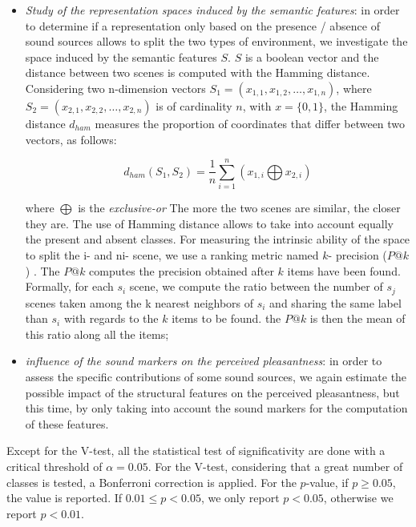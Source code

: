\documentclass[twoside,twocolumn]{article}
\begin{document}
\begin{itemize}
\item \emph{Study of the representation spaces induced by the semantic features}: in order to determine if a representation only based on the presence / absence of sound sources allows to split the two types of environment, we investigate the space induced by the semantic features $S$. $S$ is a boolean vector and the distance between two scenes is computed with the Hamming distance. Considering two n-dimension vectors $S_1=(x_{1,1},x_{1,2},\ldots,x_{1,n})$, where $S_2=(x_{2,1},x_{2,2},\ldots,x_{2,n})$ is of cardinality $n$, with $x=\lbrace 0,1\rbrace$, the Hamming distance $d_{ham}$ measures the proportion of coordinates that differ between two vectors, as follows:

\begin{equation*}
d_{ham}(S_1,S_2)=\dfrac{1}{n}\sum_{i=1}^{n} (x_{1,i} \bigoplus x_{2,i})
\end{equation*}

where $\bigoplus$ is the \emph{exclusive-or} The more the two scenes are similar, the closer they are. The use of Hamming distance allows to take into account equally the present and absent classes. For measuring the intrinsic ability of the space to split the i- and ni- scene, we use a ranking metric named $k$- precision ($P@k$) . The $P@k$ computes the precision obtained after $k$ items have been found. Formally, for each $s_i$ scene, we compute the ratio between the number of $s_j$ scenes taken among the k nearest neighbors of $s_i$ and sharing the same label than $s_i$ with regards to the $k$ items to be found. the $P@k$ is then the mean of this ratio along all the items;

\item \emph{influence of the sound markers on the perceived pleasantness}: in order to assess the specific contributions of some sound sources, we again estimate the possible impact of the structural features on the perceived pleasantness, but this time, by only taking into account the sound markers for the computation of these features.
\end{itemize}

Except for the V-test, all the statistical test of significativity are done with a critical threshold of $\alpha=0.05$. For the V-test, considering that a great number of classes is tested, a Bonferroni correction is applied. For the $p$-value, if $p\geq0.05$, the value is reported. If $0.01\leq p<0.05$, we only report $p<0.05$, otherwise we report $p<0.01$.
\end{document}
